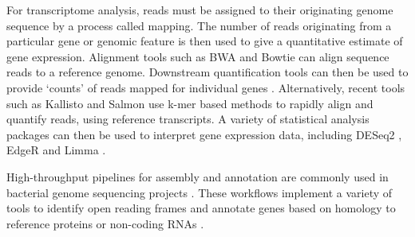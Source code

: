 For transcriptome analysis, reads must be assigned to their originating genome sequence by a process called mapping. The number of reads originating from a particular gene or genomic feature is then used to give a quantitative estimate of gene expression. Alignment tools such as BWA \citep{Li2009-cw} and Bowtie \citep{Langmead2012-xq} can align sequence reads to a reference genome. Downstream quantification tools can then be used to provide ‘counts’ of reads mapped for individual genes \citep{Li_Dewey_2011,Anders_Pyl_Huber_2015,Trapnell_Roberts_Goff_Pertea_Kim_Kelley_Pimentel_Salzberg_Rinn_Pachter_2012}. Alternatively, recent tools such as Kallisto \citep{Bray2016-oi} and Salmon \citep{Patro_Duggal_Love_Irizarry_Kingsford_2017} use k-mer based methods to rapidly align and quantify reads, using reference transcripts. A variety of statistical analysis  packages can then be used to interpret gene expression data, including DESeq2 \citep{Love2014-dv}, EdgeR \citep{Robinson_McCarthy_Smyth_2010} and Limma \citep{Ritchie_Phipson_Wu_Hu_Law_Shi_Smyth_2015}.\par
High-throughput pipelines for assembly and annotation are commonly used in bacterial genome sequencing projects \citep{Seemann_2014,Aziz_2008,Tatusova_DiCuccio_Badretdin_Chetvernin_Nawrocki_Zaslavsky_Lomsadze_Pruitt_Borodovsky_Ostell_2016}. These workflows implement a variety of tools to identify open reading frames \citep{Delcher_Bratke_Powers_Salzberg_2007,Hyatt_Chen_Locascio_Land_Larimer_Hauser_2010} and annotate genes based on homology to reference proteins or non-coding RNAs \citep{Punta_2012,Huerta_2017,Altschul1990-kr,Nawrocki_Infernal_2013,Nawrocki_Rfam_2015}.\par

